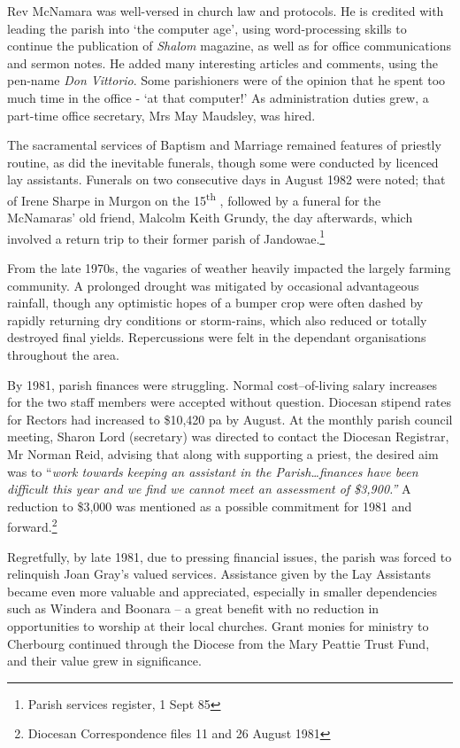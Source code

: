 Rev McNamara was well-versed in church law and protocols. He is credited with leading the parish into `the computer age', using word-processing skills to continue the publication of \emph{Shalom} magazine, as well as for office communications and sermon notes. He added many interesting articles and comments, using the pen-name \emph{Don Vittorio}. Some parishioners were of the opinion that he spent too much time in the office - `at that computer!' As administration duties grew, a part-time office secretary, Mrs May Maudsley, was hired.

The sacramental services of Baptism and Marriage remained features of priestly routine, as did the inevitable funerals, though some were conducted by licenced lay assistants. Funerals on two consecutive days in August 1982 were noted; that of Irene Sharpe in Murgon on the 15\textsuperscript{th} , followed by a funeral for the McNamaras' old friend, Malcolm Keith Grundy, the day afterwards, which involved a return trip to their former parish of Jandowae.\footnote{Parish services register, 1 Sept 85}

From the late 1970s, the vagaries of weather heavily impacted the largely farming community. A prolonged drought was mitigated by occasional advantageous rainfall, though any optimistic hopes of a bumper crop were often dashed by rapidly returning dry conditions or storm-rains, which also reduced or totally destroyed final yields. Repercussions were felt in the dependant organisations throughout the area.

By 1981, parish finances were struggling. Normal cost--of-living salary increases for the two staff members were accepted without question. Diocesan stipend rates for Rectors had increased to \$10,420 pa by August. At the monthly parish council meeting, Sharon Lord (secretary) was directed to contact the Diocesan Registrar, Mr Norman Reid, advising that along with supporting a priest, the desired aim was to ``\emph{work towards keeping an assistant in the Parish\ldots finances have been difficult this year and we find we cannot meet an assessment of \$3,900.''} A reduction to \$3,000 was mentioned as a possible commitment for 1981 and forward.\footnote{Diocesan Correspondence files 11 and 26 August 1981}

Regretfully, by late 1981, due to pressing financial issues, the parish was forced to relinquish Joan Gray's valued services. Assistance given by the Lay Assistants became even more valuable and appreciated, especially in smaller dependencies such as Windera and Boonara -- a great benefit with no reduction in opportunities to worship at their local churches. Grant monies for ministry to Cherbourg continued through the Diocese from the Mary Peattie Trust Fund, and their value grew in significance.

